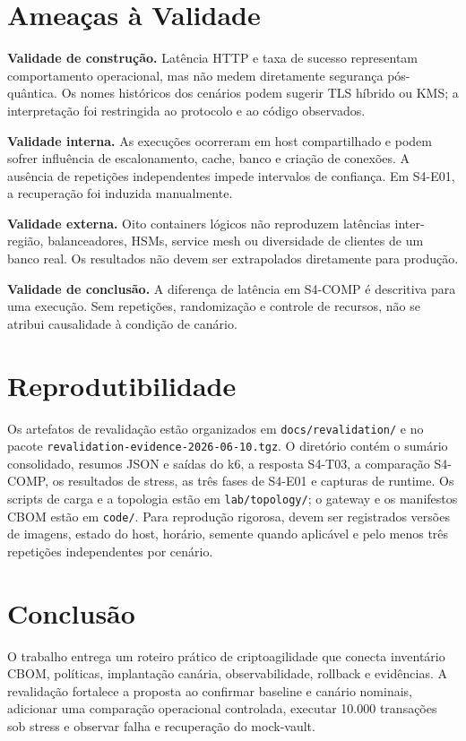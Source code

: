 \documentclass[12pt]{article}
\begin{document}
\section{Amea\c{c}as \`a Validade}
\textbf{Validade de constru\c{c}\~ao.} Lat\^encia HTTP e taxa de sucesso representam comportamento operacional, mas n\~ao medem diretamente seguran\c{c}a p\'os-qu\^antica. Os nomes hist\'oricos dos cen\'arios podem sugerir TLS h\'ibrido ou KMS; a interpreta\c{c}\~ao foi restringida ao protocolo e ao c\'odigo observados.

\textbf{Validade interna.} As execu\c{c}\~oes ocorreram em host compartilhado e podem sofrer influ\^encia de escalonamento, cache, banco e cria\c{c}\~ao de conex\~oes. A aus\^encia de repeti\c{c}\~oes independentes impede intervalos de confian\c{c}a. Em S4-E01, a recupera\c{c}\~ao foi induzida manualmente.

\textbf{Validade externa.} Oito containers l\'ogicos n\~ao reproduzem lat\^encias inter-regi\~ao, balanceadores, HSMs, service mesh ou diversidade de clientes de um banco real. Os resultados n\~ao devem ser extrapolados diretamente para produ\c{c}\~ao.

\textbf{Validade de conclus\~ao.} A diferen\c{c}a de lat\^encia em S4-COMP \'e descritiva para uma execu\c{c}\~ao. Sem repeti\c{c}\~oes, randomiza\c{c}\~ao e controle de recursos, n\~ao se atribui causalidade \`a condi\c{c}\~ao de can\'ario.

\section{Reprodutibilidade}
Os artefatos de revalida\c{c}\~ao est\~ao organizados em \texttt{docs/revalidation/} e no pacote \texttt{revalidation-evidence-2026-06-10.tgz}. O diret\'orio cont\'em o sum\'ario consolidado, resumos JSON e sa\'idas do k6, a resposta S4-T03, a compara\c{c}\~ao S4-COMP, os resultados de stress, as tr\^es fases de S4-E01 e capturas de runtime. Os scripts de carga e a topologia est\~ao em \texttt{lab/topology/}; o gateway e os manifestos CBOM est\~ao em \texttt{code/}. Para reprodu\c{c}\~ao rigorosa, devem ser registrados vers\~oes de imagens, estado do host, hor\'ario, semente quando aplic\'avel e pelo menos tr\^es repeti\c{c}\~oes independentes por cen\'ario.

\section{Conclus\~ao}
O trabalho entrega um roteiro pr\'atico de criptoagilidade que conecta invent\'ario CBOM, pol\'iticas, implanta\c{c}\~ao can\'aria, observabilidade, rollback e evid\^encias. A revalida\c{c}\~ao fortalece a proposta ao confirmar baseline e can\'ario nominais, adicionar uma compara\c{c}\~ao operacional controlada, executar 10.000 transa\c{c}\~oes sob stress e observar falha e recupera\c{c}\~ao do mock-vault.
\end{document}
